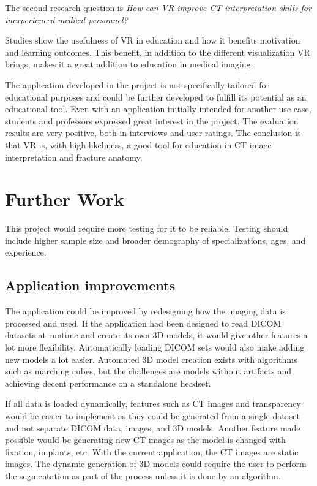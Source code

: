 \documentclass[a4paper]{report}
\begin{document}
The second research question is \emph{How can VR improve CT interpretation skills for inexperienced medical personnel?}

Studies show the usefulness of VR in education and how it benefits motivation and learning outcomes. This benefit, in addition to the different visualization VR brings, makes it a great addition to education in medical imaging.

The application developed in the project is not specifically tailored for educational purposes and could be further developed to fulfill its potential as an educational tool.
Even with an application initially intended for another use case, students and professors expressed great interest in the project. The evaluation results are very positive, both in interviews and user ratings.
The conclusion is that VR is, with high likeliness, a good tool for education in CT image interpretation and fracture anatomy.


\chapter{Further Work}
This project would require more testing for it to be reliable. Testing should include higher sample size and broader demography of specializations, ages, and experience.

\section{Application improvements}
The application could be improved by redesigning how the imaging data is processed and used. If the application had been designed to read DICOM datasets at runtime and create its own 3D models, it would give other features a lot more flexibility. Automatically loading DICOM sets would also make adding new models a lot easier. Automated 3D model creation exists with algorithms such as marching cubes, but the challenges are models without artifacts and achieving decent performance on a standalone headset.

If all data is loaded dynamically, features such as CT images and transparency would be easier to implement as they could be generated from a single dataset and not separate DICOM data, images, and 3D models. Another feature made possible would be generating new CT images as the model is changed with fixation, implants, etc. With the current application, the CT images are static images.
The dynamic generation of 3D models could require the user to perform the segmentation as part of the process unless it is done by an algorithm.
\end{document}
